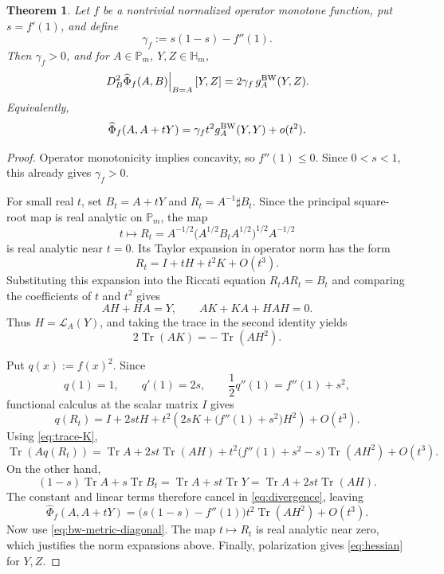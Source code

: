 \documentclass[11pt]{amsart}
\newtheorem{theorem}{Theorem}[section]
\theoremstyle{definition}
\theoremstyle{remark}
\newcommand{\Pm}{\mathbb P_m}
\newcommand{\Hm}{\mathbb H_m}
\newcommand{\Tr}{\operatorname{Tr}}
\newcommand{\altPhi}{\widehat{\Phi}}
\begin{document}
	\begin{theorem}
		\label{thm:hessian}
		Let $f$ be a nontrivial normalized operator monotone function, put
		$s=f'(1)$, and
		define
		\[
		\gamma_f:=s(1-s)-f''(1).
		\]
		Then $\gamma_f>0$, and for $A\in\Pm$, $Y,Z\in\Hm$,
		\begin{equation}\label{eq:hessian}
			\left.D_B^2\altPhi_f(A,B)\right|_{B=A}[Y,Z]
			=2\gamma_f\,g_A^{\rm BW}(Y,Z).
		\end{equation}
		Equivalently,
		\[
		\altPhi_f(A,A+tY)
		=\gamma_f t^2g_A^{\rm BW}(Y,Y)+o(t^2).
		\]
	\end{theorem}
	
	\begin{proof}
		Operator monotonicity implies concavity, so $f''(1)\le0$.  Since
		$0<s<1$, this already gives $\gamma_f>0$.
		
		For small real $t$, set $B_t=A+tY$ and
		$R_t=A^{-1}\sharp B_t$.  Since the principal square-root map is real analytic on $\Pm$, the map
		\[
		t\longmapsto R_t
		=A^{-1/2}\bigl(A^{1/2}B_tA^{1/2}\bigr)^{1/2}A^{-1/2}
		\]
		is real analytic near $t=0$.  Its Taylor expansion in operator norm has
		the form
		\[
		R_t=I+tH+t^2K+O(t^3).
		\]
		Substituting this expansion into the Riccati equation
		$R_tAR_t=B_t$ and comparing the coefficients of $t$ and $t^2$
		gives
		\begin{equation}\label{eq:riccati-expansion}
			AH+HA=Y,
			\qquad
			AK+KA+HAH=0.
		\end{equation}
		Thus $H=\mathcal L_A(Y)$, and taking the trace in the second identity yields
		\begin{equation}\label{eq:trace-K}
			2\Tr(AK)=-\Tr(AH^2).
		\end{equation}
		
		Put $q(x):=f(x)^2$.  Since
		\[
		q(1)=1,\qquad q'(1)=2s,\qquad
		\frac12q''(1)=f''(1)+s^2,
		\]
		functional calculus at the scalar matrix $I$ gives
		\[
		q(R_t)
		=I+2stH
		+t^2\!\left(2sK+\bigl(f''(1)+s^2\bigr)H^2\right)
		+O(t^3).
		\]
		Using \eqref{eq:trace-K},
		\[
		\Tr(Aq(R_t))
		=\Tr A+2st\Tr(AH)
		+t^2\bigl(f''(1)+s^2-s\bigr)\Tr(AH^2)
		+O(t^3).
		\]
		On the other hand,
		\[
		(1-s)\Tr A+s\Tr B_t
		=\Tr A+st\Tr Y
		=\Tr A+2st\Tr(AH).
		\]
		The constant and linear terms therefore cancel in
		\eqref{eq:divergence}, leaving
		\[
		\altPhi_f(A,A+tY)
		=\bigl(s(1-s)-f''(1)\bigr)t^2\Tr(AH^2)+O(t^3).
		\]
		Now use \eqref{eq:bw-metric-diagonal}.  The map $t\mapsto R_t$ is real
		analytic near zero, which justifies the norm expansions above.  Finally,
		polarization gives \eqref{eq:hessian} for $Y,Z$.
	\end{proof}
	
\end{document}
